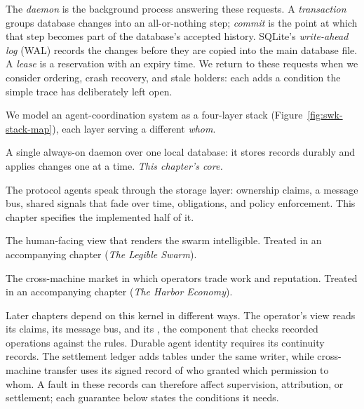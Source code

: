 \documentclass[11pt,a4paper]{article}
\theoremstyle{definition}
\theoremstyle{remark}
\begin{document}
The \emph{daemon} is the background process answering these requests. A
\emph{transaction} groups database changes into an all-or-nothing step;
\emph{commit} is the point at which that step becomes part of the database's
accepted history. SQLite's \emph{write-ahead log} (WAL) records the changes
before they are copied into the main database file. A \emph{lease} is a
reservation with an expiry time. We return to these requests when we
consider ordering, crash recovery, and stale holders: each adds a condition
the simple trace has deliberately left open.


We model an agent-coordination system as a four-layer stack
(Figure~\ref{fig:swk-stack-map}), each layer serving a different \emph{whom}.
\begin{description}[leftmargin=2.2em,style=nextline]
\item[L0, storage (the machine).] A single always-on daemon over one local
database: it stores records durably and applies changes one at a time.
\emph{This chapter's core.}
\item[Coordination (the agents).] The protocol agents speak through the storage
layer: ownership claims, a message bus, shared signals that fade over time,
obligations, and policy enforcement. This chapter specifies the implemented
half of it.
\item[Legibility (the operator).] The human-facing view that renders the swarm
intelligible. Treated in an accompanying chapter (\emph{The Legible Swarm}).
\item[Economy (the market between operators).] The cross-machine market in which
operators trade work and reputation. Treated in an accompanying chapter (\emph{The
Harbor Economy}).
\end{description}
\noindent Later chapters depend on this kernel in different ways.
The operator's view reads its claims, its message bus, and its
, the component that checks recorded operations against
the rules.
Durable agent identity requires its continuity records. The settlement ledger
adds tables under the same writer, while cross-machine transfer uses its signed
record of who granted which permission to whom. A fault in these records can
therefore affect supervision, attribution, or settlement; each guarantee below
states the conditions it needs.
\end{document}
